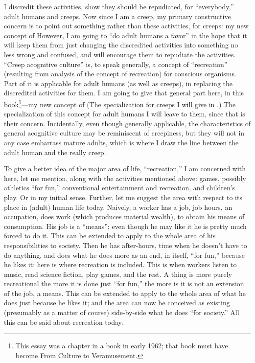 I discredit these activities, show they should be repudiated, for \enquote{everybody,} adult humans and creeps. Now since I am a creep, my primary constructive concern is to point out something rather than these activities, for creeps: my new concept of  However, I am going to \enquote{do adult humans a favor} in the hope that it will keep them from just changing the discredited activities into something no less wrong and confused, and will encourage them to repudiate the activities. \enquote{Creep acognitive culture} is, to speak generally, a concept of \enquote{recreation} (resulting from analysis of the concept of recreation) for conscious organisms. Part of it is applicable for adult humans (as well as creeps), in replacing the discredited activities for them. I am going to give that general part here, in this book\footnote{This essay was a chapter in a book in early 1962; that book must have become From Culture to Veramusement.}---my new concept of  (The specialization for creeps I will give in .) The specialization of this concept for adult humans I will leave to them, since that is their concern. Incidentally, even though generally applicable, the characteristics of general acognitive culture may be reminiscent of creepiness, but they will not in any case embarrass mature adults, which is where I draw the line between the adult human and the really creep.

To give a better idea of the major area of life, \enquote{recreation,} I am concerned with here, let me mention, along with the activities mentioned above: games, possibly athletics \enquote{for fun,} conventional entertainment and recreation, and children's play. Or  in my initial sense. Further, let me suggest the area with respect to its place in (adult) human life today. Naively, a worker has a job, job hours, an occupation, does work (which produces material wealth), to obtain his means of consumption. His job is a \enquote{means}; even though he may like it he is pretty much forced to do it. This can be extended to apply to the whole area of his responsibilities to society. Then he has after-hours, time when he doesn't have to do anything, and does what he does more as an end, in itself, \enquote{for fun,} because he likes it: here is where recreation is included. This is when workers listen to music, read science fiction, play games, and the rest. A thing is more purely recreational the more it is done just \enquote{for fun,} the more is it is not an extension of the job, a means. This can be extended to apply to the whole area of what he does just because he likes it; and the area can now be conceived as existing (presumably as a matter of course) side-by-side what he does \enquote{for society.} All this can be said about recreation today.

